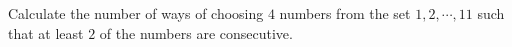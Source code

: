 Calculate the number of ways of choosing $4$ numbers from the set ${1,2,\cdots ,11}$ such that at least $2$ of the numbers are consecutive.